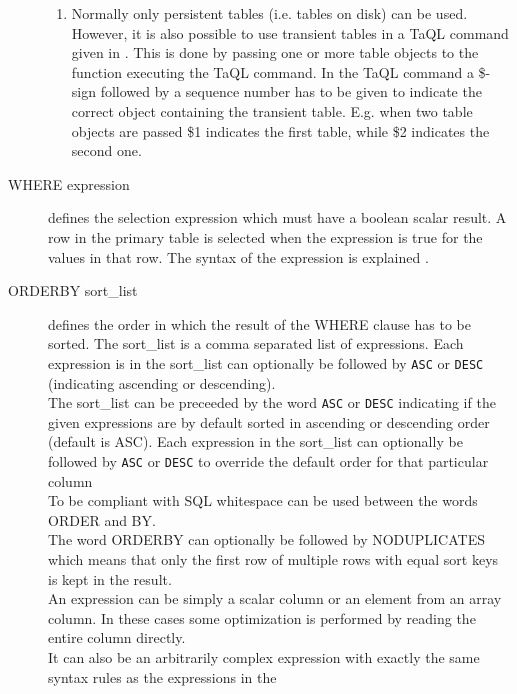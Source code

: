 \begin{description}
\begin{enumerate}
       \item
       Normally only persistent tables (i.e. tables on disk) can
       be used. However, it is also possible to use transient tables
       in a TaQL command given in .
       This is done by passing one or more table objects to the
       function executing the TaQL command. In the TaQL command a
       \$-sign followed by a sequence number has to be given to
       indicate the correct object containing the transient table.
       E.g. when two
       table objects are passed \$1 indicates the first table, while \$2
       indicates the second one.
     \end{enumerate}

  \item[WHERE expression]
       defines the selection expression which must have a boolean
       scalar result. A row in the primary table
       is selected when the expression is true for the values in that row.
       The syntax of the expression is explained
       .
  \item[ORDERBY sort\_list]
       defines the order in which the result of the WHERE clause
       has to be sorted. The sort\_list is a comma separated list of
       expressions.
       Each expression is in the sort\_list can optionally be
       followed by \texttt{ASC} or \texttt{DESC}
       (indicating ascending or descending).
       \\The sort\_list can be preceeded by the word \texttt{ASC} or
       \texttt{DESC} indicating if the given expressions are by
       default sorted in ascending or descending order (default is ASC).
       Each expression in the sort\_list can optionally be
       followed by \texttt{ASC} or \texttt{DESC} to override the
       default order for that particular column
       \\To be compliant with SQL whitespace can be used between the
       words ORDER and BY.
       \\The word ORDERBY can optionally be followed by NODUPLICATES
       which means that only the first row of multiple rows with
       equal sort keys is kept in the result.
       \\An expression can be simply a scalar column or an element from
       an array column. In these cases some optimization is performed
       by reading the entire column directly.
       \\It can also be an arbitrarily complex expression
       with exactly the same syntax rules as the expressions in the

\end{description}
